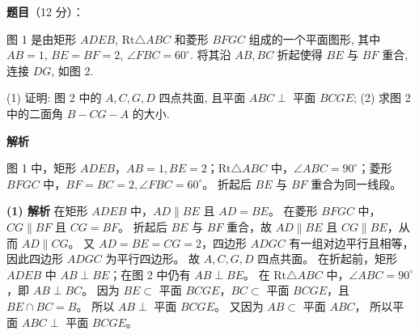 \begin{answer}

\textbf{题目}（12 分）：

图 1 是由矩形 $ADEB$, $\text{Rt}\triangle ABC$ 和菱形 $BFGC$ 组成的一个平面图形, 其中 $AB = 1$, $BE = BF = 2$, $\angle FBC = 60^\circ$. 将其沿 $AB, BC$ 折起使得 $BE$ 与 $BF$ 重合, 连接 $DG$, 如图 2.
\nopagebreak[4]
\begin{center}\end{center}
\nopagebreak[4]
(1) 证明: 图 2 中的 $A, C, G, D$ 四点共面, 且平面 $ABC \perp$ 平面 $BCGE$;  
(2) 求图 2 中的二面角 $B - CG - A$ 的大小.

\textbf{解析}

图 1 中，矩形 $ADEB$，$AB = 1, BE = 2$；$\text{Rt}\triangle ABC$ 中，$\angle ABC = 90^\circ$；菱形 $BFGC$ 中，$BF = BC = 2, \angle FBC = 60^\circ$。
折起后 $BE$ 与 $BF$ 重合为同一线段。

\textbf{(1) 解析}
在矩形 $ADEB$ 中，$AD \parallel BE$ 且 $AD = BE$。
在菱形 $BFGC$ 中，$CG \parallel BF$ 且 $CG = BF$。
折起后 $BE$ 与 $BF$ 重合，故 $AD \parallel BE$ 且 $CG \parallel BE$，从而 $AD \parallel CG$。
又 $AD = BE = CG = 2$，四边形 $ADGC$ 有一组对边平行且相等，因此四边形 $ADGC$ 为平行四边形。
故 $A, C, G, D$ 四点共面。
在折起前，矩形 $ADEB$ 中 $AB \perp BE$；在图 2 中仍有 $AB \perp BE$。
在 $\text{Rt}\triangle ABC$ 中，$\angle ABC = 90^\circ$，即 $AB \perp BC$。
因为 $BE \subset$ 平面 $BCGE$，$BC \subset$ 平面 $BCGE$，且 $BE \cap BC = B$。
所以 $AB \perp$ 平面 $BCGE$。
又因为 $AB \subset$ 平面 $ABC$，
所以平面 $ABC \perp$ 平面 $BCGE$。


\end{answer}
